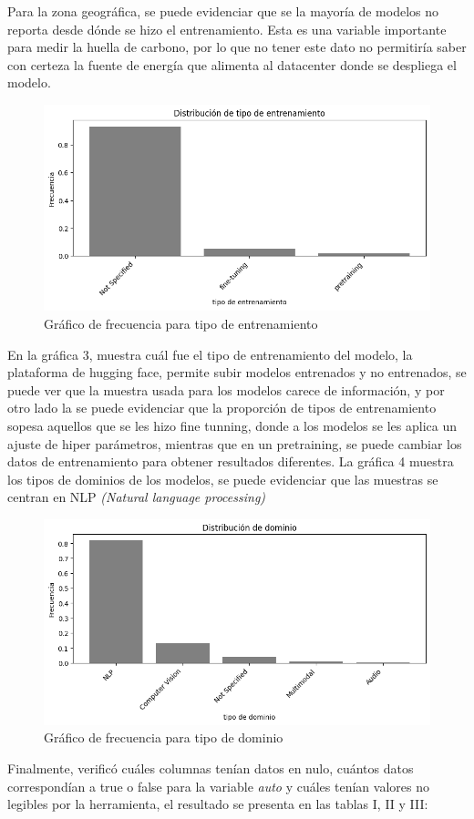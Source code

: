 \documentclass[journal]{IEEEtran}
\begin{document}
	Para la zona geográfica, se puede evidenciar que se la mayoría de modelos no reporta desde dónde se hizo el entrenamiento. Esta es una variable importante para medir la huella de carbono, por lo que no tener este dato no permitiría saber con certeza la fuente de energía que alimenta al datacenter donde se despliega el modelo.
	\begin{figure}[H]
		\centering
		\includegraphics[width=0.8\columnwidth]{assets/training_types.png}
		
		\caption{Gráfico de frecuencia para  tipo de entrenamiento}
		\label{fig:pca_scatter}
	\end{figure}
	En la gráfica 3, muestra cuál fue el tipo de entrenamiento del modelo, la plataforma de hugging face, permite subir modelos entrenados y no entrenados, se puede ver que la muestra usada para los modelos carece de información, y por otro lado la se puede evidenciar que la proporción de tipos de entrenamiento sopesa aquellos que se les hizo fine tunning, donde a los modelos se les aplica un ajuste de hiper parámetros, mientras que en un pretraining, se puede cambiar los datos de entrenamiento para obtener resultados diferentes.
	La gráfica 4 muestra los tipos de dominios de los modelos, se puede evidenciar que las muestras se centran en NLP \textit{(Natural language processing)}
	\begin{figure}[H]
		\centering
		\includegraphics[width=0.8\columnwidth]{assets/domain_types.png}
		
		\caption{Gráfico de frecuencia para  tipo de dominio}
		\label{fig:pca_scatter}
	\end{figure}
	Finalmente, verificó cuáles columnas tenían datos en nulo, cuántos datos correspondían a true o false para la variable \textit{auto} y cuáles tenían valores no legibles por la herramienta, el resultado se presenta en las tablas I, II y III:
	
\end{document}

